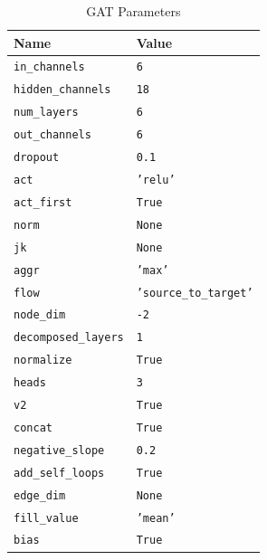 \begin{table}[H]
	\centering
	\caption{\ac{GAT} Parameters}
	\begin{tabular}{ll}
		\toprule
		\textbf{Name} & \textbf{Value} \\
		\midrule
		\texttt{in\_channels} & \texttt{6} \\
		\texttt{hidden\_channels} & \texttt{18} \\
		\texttt{num\_layers} &  \texttt{6} \\
		\texttt{out\_channels} & \texttt{6} \\
		\texttt{dropout} & \texttt{0.1} \\
		\texttt{act} & \texttt{'relu'} \\
		\texttt{act\_first} & \texttt{True} \\
		\texttt{norm} & \texttt{None} \\
		\texttt{jk} & \texttt{None} \\
		\texttt{aggr} & \texttt{'max'} \\
		\texttt{flow} & \texttt{'source\_to\_target'} \\
		\texttt{node\_dim} & \texttt{-2} \\
		\texttt{decomposed\_layers} & \texttt{1} \\
		\texttt{normalize} & \texttt{True} \\
		\texttt{heads} & \texttt{3} \\
		\texttt{v2} & \texttt{True} \\
		\texttt{concat} & \texttt{True} \\
		\texttt{negative\_slope} & \texttt{0.2} \\
		\texttt{add\_self\_loops} & \texttt{True} \\
		\texttt{edge\_dim} & \texttt{None} \\
		\texttt{fill\_value} & \texttt{'mean'} \\
		\texttt{bias} & \texttt{True} \\
	\end{tabular}
	\label{tab:gat-params-values}
\end{table}

